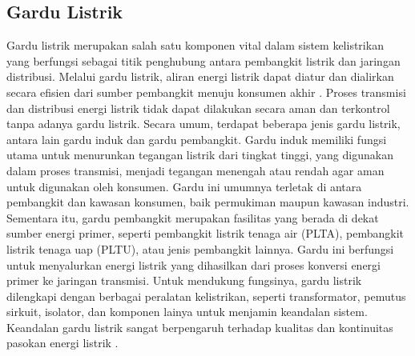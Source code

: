 \subsection{Gardu Listrik}
\sloppy
Gardu listrik merupakan salah satu komponen vital dalam sistem kelistrikan yang berfungsi sebagai titik penghubung antara pembangkit listrik dan jaringan distribusi. Melalui gardu listrik, aliran energi listrik dapat diatur dan dialirkan secara efisien dari sumber pembangkit menuju konsumen akhir \cite{stevenson1994power}. Proses transmisi dan distribusi energi listrik tidak dapat dilakukan secara aman dan terkontrol tanpa adanya gardu listrik. Secara umum, terdapat beberapa jenis gardu listrik, antara lain gardu induk dan gardu pembangkit. Gardu induk memiliki fungsi utama untuk menurunkan tegangan listrik dari tingkat tinggi, yang digunakan dalam proses transmisi, menjadi tegangan menengah atau rendah agar aman untuk digunakan oleh konsumen. Gardu ini umumnya terletak di antara pembangkit dan kawasan konsumen, baik permukiman maupun kawasan industri. Sementara itu, gardu pembangkit merupakan fasilitas yang berada di dekat sumber energi primer, seperti pembangkit listrik tenaga air (PLTA), pembangkit listrik tenaga uap (PLTU), atau jenis pembangkit lainnya. Gardu ini berfungsi untuk menyalurkan energi listrik yang dihasilkan dari proses konversi energi primer ke jaringan transmisi. Untuk mendukung fungsinya, gardu listrik dilengkapi dengan berbagai peralatan kelistrikan, seperti transformator, pemutus sirkuit, isolator, dan komponen lainya untuk menjamin keandalan sistem. Keandalan gardu listrik sangat berpengaruh terhadap kualitas dan kontinuitas pasokan energi listrik \cite{gonen2016electric}.

